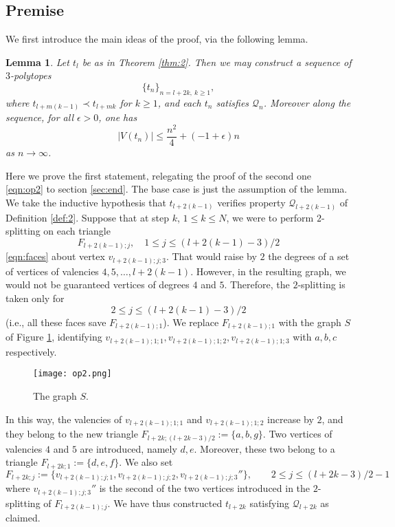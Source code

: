 \documentclass[11pt]{article}
\newtheorem{lemma}[thm]{Lemma}
\theoremstyle{definition}
\numberwithin{equation}{section}
\def\calP{\mathcal{P}}
\def\calQ{\mathcal{Q}}
\begin{document}
\subsection{Premise}
\label{sec:pre}
We first introduce the main ideas of the proof, via the following lemma.%
\begin{lemma}
	\label{le:2}
	Let $t_l$ be as in Theorem \ref{thm:2}. Then we may construct a sequence of $3$-polytopes
	\[\{t_n\}_{n=l+2k, \ k\geq 1},\]
	where $t_{l+m(k-1)}\prec t_{l+mk}$ for $k\geq 1$, and each $t_n$ satisfies $\calQ_{n}$. Moreover along the sequence, for all $\epsilon>0$, one has
	\begin{equation}
	\label{eqn:op2}
	|V(t_n)|\leq\frac{n^2}{4}+\left(-1+\epsilon\right)n
	\end{equation}
	as $n\to\infty$.
\end{lemma}
Here we prove the first statement, relegating the proof of the second one \eqref{eqn:op2} to section \ref{sec:end}. The base case is just the assumption of the lemma. We take the inductive hypothesis that $t_{l+2(k-1)}$ verifies property $\calQ_{l+2(k-1)}$ of Definition \ref{def:2}. Suppose that at step $k$, $1\leq k\leq N$, we were to perform $2$-splitting on each triangle \[F_{l+2(k-1);j}, \quad 1\leq j\leq(l+2(k-1)-3)/2\]
\eqref{eqn:faces} about vertex $v_{l+2(k-1);j;3}$. That would raise by $2$ the degrees of a set of vertices of valencies $4,5,\dots, l+2(k-1)$. However, in the resulting graph, we would not be guaranteed vertices of degrees $4$ and $5$. Therefore, the $2$-splitting is taken only for
\[
2\leq j\leq (l+2(k-1)-3)/2
\]
(i.e., all these faces save $F_{l+2(k-1);1}$). We replace $F_{l+2(k-1);1}$ with the graph $S$ of Figure \ref{fig:op2}, identifying $v_{l+2(k-1);1;1}, v_{l+2(k-1);1;2}, v_{l+2(k-1);1;3}$ with $a,b,c$ respectively.

\begin{figure}[h!]
	\centering
	\texttt{[image: op2.png]}
	\caption{The graph $S$.}
	\label{fig:op2}
\end{figure}

In this way, the valencies of $v_{l+2(k-1);1;1}$ and $v_{l+2(k-1);1;2}$ increase by $2$, and they belong to the new triangle $F_{l+2k;(l+2k-3)/2}:=\{a,b,g\}$. Two vertices of valencies $4$ and $5$ are introduced, namely $d,e$. Moreover, these two belong to a triangle $F_{l+2k;1}:=\{d,e,f\}$. We also set
\[F_{l+2k;j}:=\{v_{l+2(k-1);j;1},v_{l+2(k-1);j;2},v_{l+2(k-1);j;3}''\}, \qquad 2\leq j\leq (l+2k-3)/2-1\]
where $v_{l+2(k-1);j;3}''$ is the second of the two vertices introduced in the $2$-splitting of $F_{l+2(k-1);j}$. We have thus constructed $t_{l+2k}$ satisfying $\calQ_{l+2k}$ as claimed.
\end{document}
